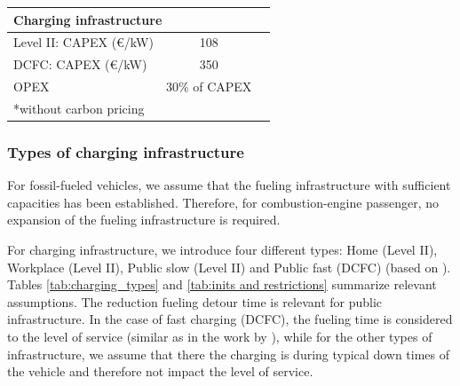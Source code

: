\documentclass[preprint,review,11pt, authoryear]{elsarticle}
\begin{document}
\begin{table}[]
\begin{tabular}{@{}lrrrl@{}}
\multicolumn{5}{l}{\textbf{Charging infrastructure}}                                                                                  \\ \midrule
Level II: CAPEX (\euro/kW)                             & \multicolumn{3}{c}{108}                                                        &         \citep{Lanz2022}  \\
DCFC: CAPEX (\euro/kW)                             & \multicolumn{3}{c}{350}                                                        &  \citep{Lanz2022}         \\
OPEX                      & \multicolumn{3}{c}{30\% of CAPEX}                                                         &           \\ \midrule
\multicolumn{5}{l}{*without carbon pricing}                                                                                          
\end{tabular}
\end{table}
        \subsubsection{Types of charging infrastructure}
            For fossil-fueled vehicles, we assume that the fueling infrastructure with sufficient capacities has been established. Therefore, for combustion-engine passenger, no expansion of the fueling infrastructure is required. 
    
            For charging infrastructure, we introduce four different types: Home (Level II), Workplace (Level II), Public slow (Level II)\added{,} and Public fast (DCFC) (based on \citep{LAMONACA2022111733}). Tables \ref{tab:charging_types} and \ref{tab:inits and restrictions} summarize relevant assumptions. The reduction  fueling detour time is relevant for public infrastructure. In the case of fast charging (DCFC), the fueling time is considered  to the level of service (similar as in the work by \citet{LUH2024122412}), while for the other types of infrastructure, we assume that there the charging is during typical down times of the vehicle and therefore not impact the level of service. 
\end{document}
